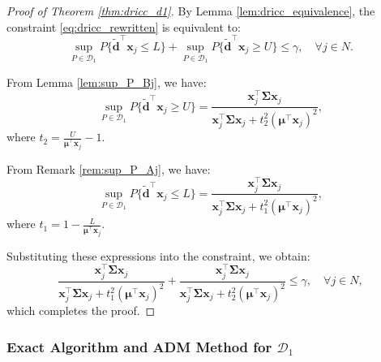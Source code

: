 \documentclass[preprint,12pt,authoryear]{elsarticle}
\begin{document}
\begin{proof}[Proof of Theorem \ref{thm:dricc_d1}]
By Lemma \ref{lem:dricc_equivalence}, the constraint \eqref{eq:dricc_rewritten} is equivalent to:
\begin{equation*}
\sup_{P \in \mathcal{D}_1} P \{\widetilde{\mathbf{d}}^\top \mathbf{x}_j \leqslant L\}  +  \sup_{P \in \mathcal{D}_1} P \{\widetilde{\mathbf{d}}^\top \mathbf{x}_j \geqslant U \} \leqslant \gamma, \quad \forall j \in N.
\end{equation*}

From Lemma \ref{lem:sup_P_Bj}, we have:
\begin{equation*}
\sup_{P \in \mathcal{D}_1} P\{\widetilde{\mathbf{d}}^\top \mathbf{x}_j \geqslant U\} = \frac{\mathbf{x}_j^\top \boldsymbol{\Sigma} \mathbf{x}_j}{\mathbf{x}_j^\top \boldsymbol{\Sigma} \mathbf{x}_j + t_2^2 (\boldsymbol{\mu}^\top \mathbf{x}_j)^2},
\end{equation*}
where $t_2 = \frac{U}{\boldsymbol{\mu}^\top \mathbf{x}_j} - 1$.

From Remark \ref{rem:sup_P_Aj}, we have:
\begin{equation*}
\sup_{P \in \mathcal{D}_1} P\{\widetilde{\mathbf{d}}^\top \mathbf{x}_j \leqslant L\} = \frac{\mathbf{x}_j^\top \boldsymbol{\Sigma} \mathbf{x}_j}{\mathbf{x}_j^\top \boldsymbol{\Sigma} \mathbf{x}_j + t_1^2 (\boldsymbol{\mu}^\top \mathbf{x}_j)^2},
\end{equation*}
where $t_1 = 1 - \frac{L}{\boldsymbol{\mu}^\top \mathbf{x}_j}$.

Substituting these expressions into the constraint, we obtain:
\begin{equation*}
\frac{\mathbf{x}_j^\top \boldsymbol{\Sigma} \mathbf{x}_j}{\mathbf{x}_j^\top \boldsymbol{\Sigma} \mathbf{x}_j + t_1^2 (\boldsymbol{\mu}^\top \mathbf{x}_j)^2} + \frac{\mathbf{x}_j^\top \boldsymbol{\Sigma} \mathbf{x}_j}{\mathbf{x}_j^\top \boldsymbol{\Sigma} \mathbf{x}_j + t_2^2 (\boldsymbol{\mu}^\top \mathbf{x}_j)^2} \leqslant \gamma, \quad \forall j \in N,
\end{equation*}
which completes the proof.
\end{proof}

\subsubsection{Exact Algorithm and ADM Method for $\mathcal{D}_1$}
\end{document}
